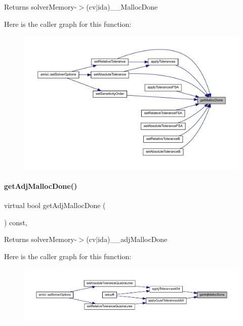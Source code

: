 \begin{DoxyReturn}{Returns}
solver\+Memory-\/$>$(cv$\vert$ida)\+\_\+\+\_\+\+Malloc\+Done 
\end{DoxyReturn}
Here is the caller graph for this function\+:
\nopagebreak
\begin{figure}[H]
\begin{center}
\leavevmode
\includegraphics[width=350pt]{classamici_1_1_solver_af4bbf9fea3348d86380be1c059e4b9f5_icgraph}
\end{center}
\end{figure}
\mbox{\label{classamici_1_1_solver_a9673b3bc9248c4b7a156da9632b91436}} 
\paragraph{\texorpdfstring{getAdjMallocDone()}{getAdjMallocDone()}}
{\footnotesize\ttfamily virtual bool get\+Adj\+Malloc\+Done (\begin{DoxyParamCaption}{ }\end{DoxyParamCaption}) const\hspace{0.3cm}{\ttfamily [protected]}, {}}

\begin{DoxyReturn}{Returns}
solver\+Memory-\/$>$(cv$\vert$ida)\+\_\+\+\_\+adj\+Malloc\+Done 
\end{DoxyReturn}
Here is the caller graph for this function\+:
\nopagebreak
\begin{figure}[H]
\begin{center}
\leavevmode
\includegraphics[width=350pt]{classamici_1_1_solver_a9673b3bc9248c4b7a156da9632b91436_icgraph}
\end{center}
\end{figure}
\mbox{\label{classamici_1_1_solver_a96a36300db9c200d9586c2b90ced4195}} 
